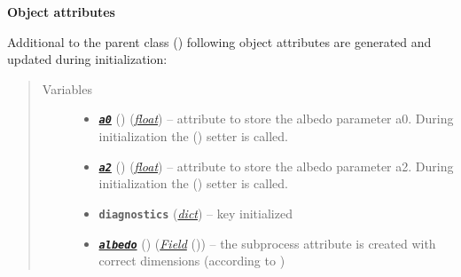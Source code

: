 \documentclass[a4paper,10pt,english]{sphinxmanual}
\begin{document}
\begin{fulllineitems}
\begin{quote}
\begin{description}
\end{description}\end{quote}

\textbf{Object attributes}

Additional to the parent class 
{\hyperref[api/climlab.process:climlab.process.diagnostic.DiagnosticProcess]{\emph{}}} ()
following object attributes are generated and updated during initialization:
\begin{quote}\begin{description}
\item[{Variables}] \leavevmode\begin{itemize}
\item {} 
{\hyperref[api/climlab.surface:climlab.surface.albedo.P2Albedo.a0]{\emph{\textbf{\texttt{a0}}}}} () (\href{http://docs.python.org/2.7/library/functions.html\#float}{\emph{float}}) -- attribute to store the albedo parameter a0. 
During initialization the 
{\hyperref[api/climlab.surface:climlab.surface.albedo.P2Albedo.a0]{\emph{}}} () setter is called.

\item {} 
{\hyperref[api/climlab.surface:climlab.surface.albedo.P2Albedo.a2]{\emph{\textbf{\texttt{a2}}}}} () (\href{http://docs.python.org/2.7/library/functions.html\#float}{\emph{float}}) -- attribute to store the albedo parameter a2. 
During initialization the 
{\hyperref[api/climlab.surface:climlab.surface.albedo.P2Albedo.a2]{\emph{}}} () setter is called.

\item {} 
\textbf{\texttt{diagnostics}} (\href{http://docs.python.org/2.7/library/stdtypes.html\#dict}{\emph{dict}}) -- key  initialized

\item {} 
{\hyperref[api/climlab.surface:module\string-climlab.surface.albedo]{\emph{\textbf{\texttt{albedo}}}}} () ({\hyperref[api/climlab.domain:climlab.domain.field.Field]{\emph{\emph{Field}}}} ()) -- the subprocess attribute  is
created with correct dimensions 
(according to )


\end{itemize}
\end{description}
\end{quote}
\end{fulllineitems}
\end{document}
